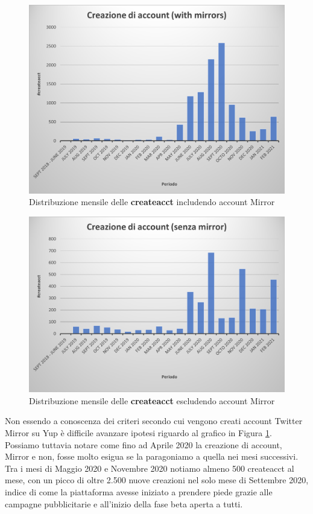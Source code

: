 \begin{figure}[t]
    \centering
    \includegraphics[width=.7\textwidth]{graphs/createaccount.png}
    \caption{Distribuzione mensile delle \textbf{createacct} includendo account Mirror}
    \label{fig:createacctMensile_conmirr}
\end{figure}

\begin{figure}[t]
    \centering
    \includegraphics[width=.7\textwidth]{graphs/createaccount_nomirr.png}
    \caption{Distribuzione mensile delle \textbf{createacct} escludendo account Mirror}
    \label{fig:createacctMensile_nomirr}
\end{figure}

Non essendo a conoscenza dei criteri secondo cui vengono creati account Twitter Mirror su Yup è difficile avanzare ipotesi riguardo al grafico in Figura \ref{fig:createacctMensile_conmirr}. Possiamo tuttavia notare come fino ad Aprile 2020 la creazione di account, Mirror e non, fosse molto esigua se la paragoniamo a quella nei mesi successivi. Tra i mesi di Maggio 2020 e Novembre 2020 notiamo almeno 500 createacct al mese, con un picco di oltre 2.500 nuove creazioni nel solo mese di Settembre 2020, indice di come la piattaforma avesse iniziato a prendere piede grazie alle campagne pubblicitarie e all'inizio della fase beta aperta a tutti.

